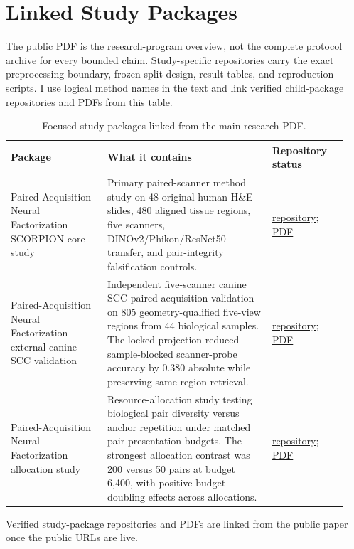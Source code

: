 \section{Linked Study Packages}
The public PDF is the research-program overview, not the complete protocol archive for every bounded claim. Study-specific repositories carry the exact preprocessing boundary, frozen split design, result tables, and reproduction scripts. I use logical method names in the text and link verified child-package repositories and PDFs from this table.

\begin{table}[t]
\centering
\caption{Focused study packages linked from the main research PDF.}
\small
\begin{tabular}{p{0.27\linewidth}p{0.46\linewidth}p{0.21\linewidth}}
\toprule
Package & What it contains & Repository status \\
\midrule
Paired-Acquisition Neural Factorization SCORPION core study & Primary paired-scanner method study on 48 original human H\&E slides, 480 aligned tissue regions, five scanners, DINOv2/Phikon/ResNet50 transfer, and pair-integrity falsification controls. & \href{https://github.com/matthewvaishnav/paired-acquisition-factorization-scorpion}{repository}; \href{https://matthewvaishnav.github.io/paired-acquisition-factorization-scorpion/paired-acquisition-factorization-scorpion.pdf}{PDF} \\
Paired-Acquisition Neural Factorization external canine SCC validation & Independent five-scanner canine SCC paired-acquisition validation on 805 geometry-qualified five-view regions from 44 biological samples. The locked projection reduced sample-blocked scanner-probe accuracy by 0.380 absolute while preserving same-region retrieval. & \href{https://github.com/matthewvaishnav/paired-acquisition-factorization-caninescc}{repository}; \href{https://matthewvaishnav.github.io/paired-acquisition-factorization-caninescc/paired-acquisition-factorization-caninescc.pdf}{PDF} \\
Paired-Acquisition Neural Factorization allocation study & Resource-allocation study testing biological pair diversity versus anchor repetition under matched pair-presentation budgets. The strongest allocation contrast was 200 versus 50 pairs at budget 6,400, with positive budget-doubling effects across allocations. & \href{https://github.com/matthewvaishnav/paired-acquisition-factorization-allocation}{repository}; \href{https://matthewvaishnav.github.io/paired-acquisition-factorization-allocation/paired-acquisition-factorization-allocation.pdf}{PDF} \\
\bottomrule
\end{tabular}
\label{tab:linked_study_packages}
\end{table}

Verified study-package repositories and PDFs are linked from the public paper once the public URLs are live.
